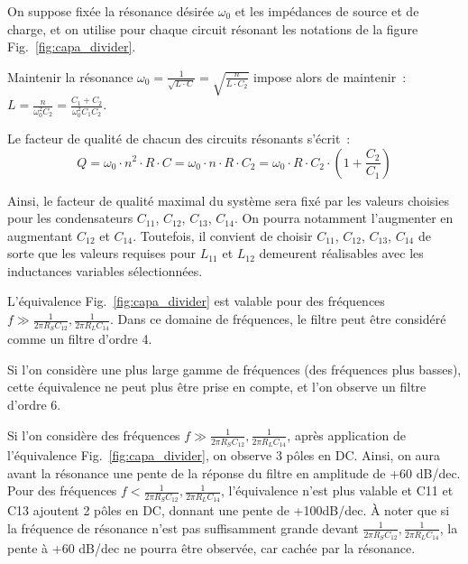 \documentclass{article}
\begin{document}

On suppose fixée la résonance désirée $\omega_0$ et les impédances de source et de charge, et on utilise pour chaque circuit résonant les notations de la figure Fig.~\ref{fig:capa_divider}.

Maintenir la résonance ${\omega_0 = \frac{1}{\sqrt{L\cdot C}} = \sqrt{\frac{n}{L\cdot C_2}}}$ impose alors de maintenir~: ${L = \frac{n}{\omega_0^2 C_2} =\frac{C_1+C_2}{\omega_0^2 C_1 C_2}}$.


Le facteur de qualité de chacun des circuits résonants s'écrit~: 
\begin{equation*}
Q = \omega_0\cdot n^2\cdot R\cdot C = \omega_0\cdot n\cdot R\cdot C_2 = \omega_0\cdot R\cdot C_2\cdot (1+\frac{C_2}{C_1})
\end{equation*}

Ainsi, le facteur de qualité maximal du système sera fixé par les valeurs choisies pour les condensateurs $C_{11}$, $C_{12}$, $C_{13}$, $C_{14}$. On pourra notamment l'augmenter en augmentant $C_{12}$ et $C_{14}$. Toutefois, il convient de choisir $C_{11}$, $C_{12}$, $C_{13}$, $C_{14}$ de sorte que les valeurs requises pour $L_{11}$ et $L_{12}$ demeurent réalisables avec les inductances variables sélectionnées.




L'équivalence Fig.~\ref{fig:capa_divider} est valable pour des fréquences ${f \gg \frac{1}{2\pi R_S C_{12}}, \frac{1}{2\pi R_L C_{14}}}$. Dans ce domaine de fréquences, le filtre peut être considéré comme un filtre d'ordre 4.

Si l'on considère une plus large gamme de fréquences (des fréquences plus basses), cette équivalence ne peut plus être prise en compte, et l'on observe un filtre d'ordre 6.


Si l'on considère des fréquences ${f \gg \frac{1}{2\pi R_S C_{12}}, \frac{1}{2\pi R_L C_{14}}}$, après application de l'équivalence Fig.~\ref{fig:capa_divider}, on observe 3 pôles en DC. Ainsi, on aura avant la résonance une pente de la réponse du filtre en amplitude de +60 dB/dec.
Pour des fréquences ${f < \frac{1}{2\pi R_S C_{12}}, \frac{1}{2\pi R_L C_{14}}}$, l'équivalence n'est plus valable et C11 et C13 ajoutent 2 pôles en DC, donnant une pente de +100dB/dec.
À noter que si la fréquence de résonance n'est pas suffisamment grande devant ${\frac{1}{2\pi R_S C_{12}}, \frac{1}{2\pi R_L C_{14}}}$, la pente à +60 dB/dec ne pourra être observée, car cachée par la résonance.
\end{document}
